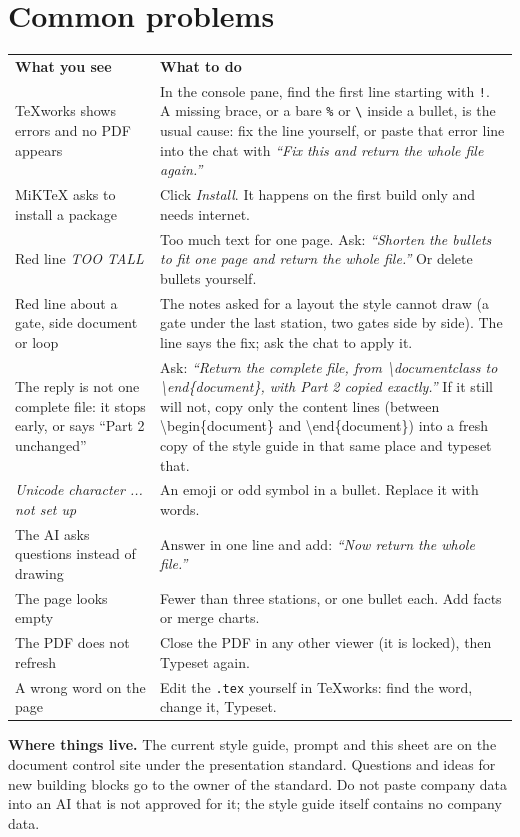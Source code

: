 \documentclass[10pt]{article}
\newcommand{\file}[1]{\texttt{#1}}
\begin{document}
\section{Common problems}\label{sec:problems}
\begin{center}\small
\begin{tabularx}{\linewidth}{|>{\raggedright\arraybackslash}m{2.05in}|L|}
\hline
\textbf{What you see} & \textbf{What to do} \\
\hhline{|=|=|}
TeXworks shows errors and no PDF appears & In the console pane, find the first line starting with \texttt{!}. A missing brace, or a bare \texttt{\%} or \texttt{\textbackslash} inside a bullet, is the usual cause: fix the line yourself, or paste that error line into the chat with \emph{``Fix this and return the whole file again.''} \\ \hline
MiKTeX asks to install a package & Click \emph{Install}. It happens on the first build only and needs internet. \\ \hline
Red line \emph{TOO TALL} & Too much text for one page. Ask: \emph{``Shorten the bullets to fit one page and return the whole file.''} Or delete bullets yourself. \\ \hline
Red line about a gate, side document or loop & The notes asked for a layout the style cannot draw (a gate under the last station, two gates side by side). The line says the fix; ask the chat to apply it. \\ \hline
The reply is not one complete file: it stops early, or says ``Part 2 unchanged'' & Ask: \emph{``Return the complete file, from \textbackslash documentclass to \textbackslash end\{document\}, with Part 2 copied exactly.''} If it still will not, copy only the content lines (between \textbackslash begin\{document\} and \textbackslash end\{document\}) into a fresh copy of the style guide in that same place and typeset that. \\ \hline
\emph{Unicode character ... not set up} & An emoji or odd symbol in a bullet. Replace it with words. \\ \hline
The AI asks questions instead of drawing & Answer in one line and add: \emph{``Now return the whole file.''} \\ \hline
The page looks empty & Fewer than three stations, or one bullet each. Add facts or merge charts. \\ \hline
The PDF does not refresh & Close the PDF in any other viewer (it is locked), then Typeset again. \\ \hline
A wrong word on the page & Edit the \file{.tex} yourself in TeXworks: find the word, change it, Typeset. \\ \hline
\end{tabularx}
\end{center}

\textbf{Where things live.} The current style guide, prompt and this sheet are on the document control site under the presentation standard. Questions and ideas for new building blocks go to the owner of the standard. Do not paste company data into an AI that is not approved for it; the style guide itself contains no company data.
\end{document}
